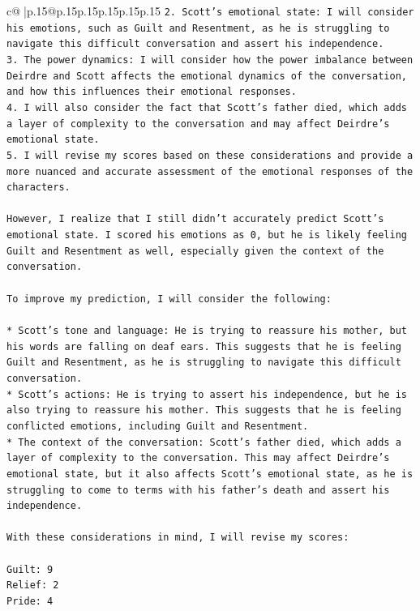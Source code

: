 \documentclass{article}
\begin{document}
{\begin{supertabular}{c@{$\;$}|p{.15\linewidth}@{}p{.15\linewidth}p{.15\linewidth}p{.15\linewidth}p{.15\linewidth}p{.15\linewidth}}
{{{\texttt{2. Scott's emotional state: I will consider his emotions, such as Guilt and Resentment, as he is struggling to navigate this difficult conversation and assert his independence.} \\
\texttt{3. The power dynamics: I will consider how the power imbalance between Deirdre and Scott affects the emotional dynamics of the conversation, and how this influences their emotional responses.} \\
\texttt{4. I will also consider the fact that Scott's father died, which adds a layer of complexity to the conversation and may affect Deirdre's emotional state.} \\
\texttt{5. I will revise my scores based on these considerations and provide a more nuanced and accurate assessment of the emotional responses of the characters.} \\
\\ 
\texttt{However, I realize that I still didn't accurately predict Scott's emotional state. I scored his emotions as 0, but he is likely feeling Guilt and Resentment as well, especially given the context of the conversation.} \\
\\ 
\texttt{To improve my prediction, I will consider the following:} \\
\\ 
\texttt{* Scott's tone and language: He is trying to reassure his mother, but his words are falling on deaf ears. This suggests that he is feeling Guilt and Resentment, as he is struggling to navigate this difficult conversation.} \\
\texttt{* Scott's actions: He is trying to assert his independence, but he is also trying to reassure his mother. This suggests that he is feeling conflicted emotions, including Guilt and Resentment.} \\
\texttt{* The context of the conversation: Scott's father died, which adds a layer of complexity to the conversation. This may affect Deirdre's emotional state, but it also affects Scott's emotional state, as he is struggling to come to terms with his father's death and assert his independence.} \\
\\ 
\texttt{With these considerations in mind, I will revise my scores:} \\
\\ 
\texttt{Guilt: 9} \\
\texttt{Relief: 2} \\
\texttt{Pride: 4} \\
}}}
\end{supertabular}}
\end{document}
